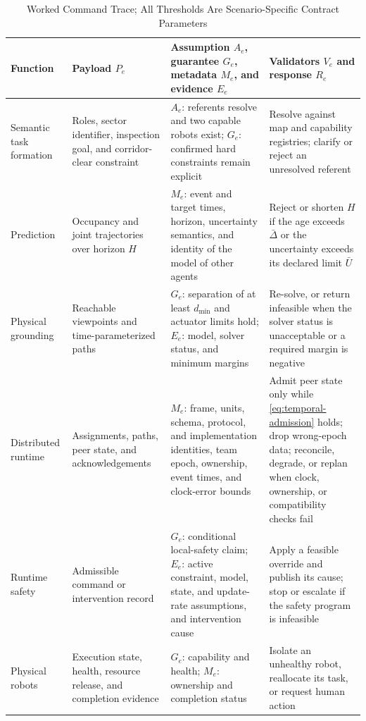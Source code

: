 \begin{table}[!t]
  \centering
  \caption{Worked Command Trace; All Thresholds Are Scenario-Specific Contract
  Parameters}
  \label{tab:command-trace}
  \scriptsize
  \setlength{\tabcolsep}{3pt}
  \renewcommand{\arraystretch}{1.08}
  \begin{tabularx}{\textwidth}{@{}P{0.12\textwidth}P{0.22\textwidth}YP{0.30\textwidth}@{}}
    \toprule
    Function & Payload $P_e$ & Assumption $A_e$, guarantee $G_e$, metadata $M_e$, and evidence $E_e$ & Validators $V_e$ and response $R_e$ \\
    \midrule
    Semantic task formation
      & Roles, sector identifier, inspection goal, and corridor-clear constraint
      & $A_e$: referents resolve and two capable robots exist; $G_e$: confirmed hard constraints remain explicit
      & Resolve against map and capability registries; clarify or reject an unresolved referent \\
    Prediction
      & Occupancy and joint trajectories over horizon $H$
      & $M_e$: event and target times, horizon, uncertainty semantics, and identity of the model of other agents
      & Reject or shorten $H$ if the age exceeds $\bar\Delta$ or the uncertainty exceeds its declared limit $\bar U$ \\
    Physical grounding
      & Reachable viewpoints and time-parameterized paths
      & $G_e$: separation of at least $d_{\min}$ and actuator limits hold; $E_e$: model, solver status, and minimum margins
      & Re-solve, or return infeasible when the solver status is unacceptable or a required margin is negative \\
    Distributed runtime
      & Assignments, paths, peer state, and acknowledgements
      & $M_e$: frame, units, schema, protocol, and implementation identities, team epoch, ownership, event times, and clock-error bounds
      & Admit peer state only while \eqref{eq:temporal-admission} holds; drop wrong-epoch data; reconcile, degrade, or replan when clock, ownership, or compatibility checks fail \\
    Runtime safety
      & Admissible command or intervention record
      & $G_e$: conditional local-safety claim; $E_e$: active constraint, model, state, and update-rate assumptions, and intervention cause
      & Apply a feasible override and publish its cause; stop or escalate if the safety program is infeasible \\
    Physical robots
      & Execution state, health, resource release, and completion evidence
      & $G_e$: capability and health; $M_e$: ownership and completion status
      & Isolate an unhealthy robot, reallocate its task, or request human action \\
    \bottomrule
  \end{tabularx}
\end{table}
